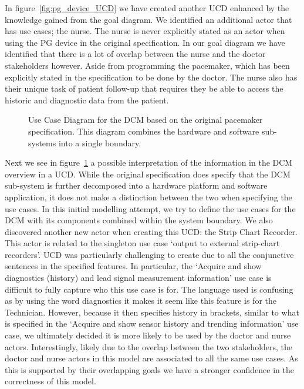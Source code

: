 In figure~\ref{fig:pg_device_UCD} we have created another UCD enhanced by the knowledge gained from the goal diagram. We identified an additional actor that has use cases; the nurse. The nurse is never explicitly stated as an actor when using the PG device in the original specification. In our goal diagram we have identified that there is a lot of overlap between the nurse and the doctor stakeholders however. Aside from programming the pacemaker, which has been explicitly stated in the specification to be done by the doctor. The nurse also has their unique task of patient follow-up that requires they be able to access the historic and diagnostic data from the patient. 

\begin{figure}
	\centering
	
	\caption{Use Case Diagram for the DCM based on the original pacemaker specification. This diagram combines the hardware and software sub-systems into a single boundary.}
	\label{fig:DCM_UCD_original_spec}
\end{figure}

Next we see in figure~\ref{fig:DCM_UCD_original_spec} a possible interpretation of the information in the DCM overview in a UCD. While the original specification does specify that the DCM sub-system is further decomposed into a hardware platform and software application, it does not make a distinction between the two when specifying the use cases. In this initial modelling attempt, we try to define the use cases for the DCM with its components combined within the system boundary. We also discovered another new actor when creating this UCD: the Strip Chart Recorder. This actor is related to the singleton use case `output to external strip-chart recorders'. UCD was particularly challenging to create due to all the conjunctive sentences in the specified features. In particular, the `Acquire and show diagnostics (history) and lead signal measurement information' use case is difficult to fully capture who this use case is for. The language used is confusing as by using the word diagnostics it makes it seem like this feature is for the Technician. However, because it then specifies history in brackets, similar to what is specified in the `Acquire and show sensor history and trending information' use case, we ultimately decided it is more likely to be used by the doctor and nurse actors. Interestingly, likely due to the overlap between the two stakeholders, the doctor and nurse actors in this model are associated to all the same use cases. As this is supported by their overlapping goals we have a stronger confidence in the correctness of this model.

